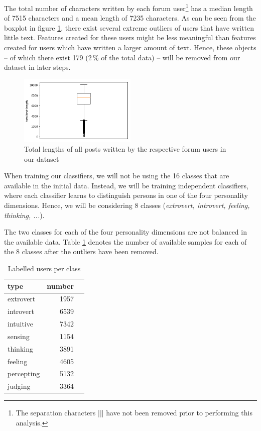 \documentclass[12pt]{elsarticle}
\begin{document}
The total number of characters written by each forum user\footnote{The separation characters ||| have not been removed prior to performing this analysis.} has a median length of 7515 characters and a mean length of 7235 characters. As can be seen from the boxplot in figure \ref{fig:lengths}, there exist several extreme outliers of users that have written little text. Features created for these users might be less meaningful than features created for users which have written a larger amount of text. Hence, these objects -- of which there exist 179 (2\,\% of the total data) -- will be removed from our dataset in later steps.






\begin{figure}[ht]
\centering
\label{fig:lengths}
\caption{Total lengths of all posts written by the respective forum users in our dataset}
\includegraphics[width=0.5\textwidth]{img/lengths.png}
\end{figure}
When training our classifiers, we will not be using the 16 classes that are available in the initial data. Instead, we will be training independent classifiers, where each classifier learns to distinguish persons in one of the four personality dimensions. Hence, we will be considering 8 classes (\textit{extrovert, introvert, feeling, thinking, ...}).

The two classes for each of the four personality dimensions are not balanced in the available data. Table \ref{tab:classes} denotes the number of available samples for each of the 8 classes after the outliers have been removed.


\begin{table}[ht]
\centering
\begin{tabular}{| l |r |l |}
\hline
  \textbf{type} & \textbf{number} \\
  \hline
  extrovert & 1957 \\
  \hline
  introvert & 6539 \\
  \hline
  intuitive & 7342 \\
  \hline
  sensing & 1154  \\
  \hline
  thinking & 3891 \\
  \hline
  feeling & 4605 \\
  \hline
  percepting & 5132 \\
  \hline
  judging & 3364  \\
  \hline
\end{tabular}
\caption{Labelled users per class}
\label{tab:classes}
\end{table}
\end{document}
